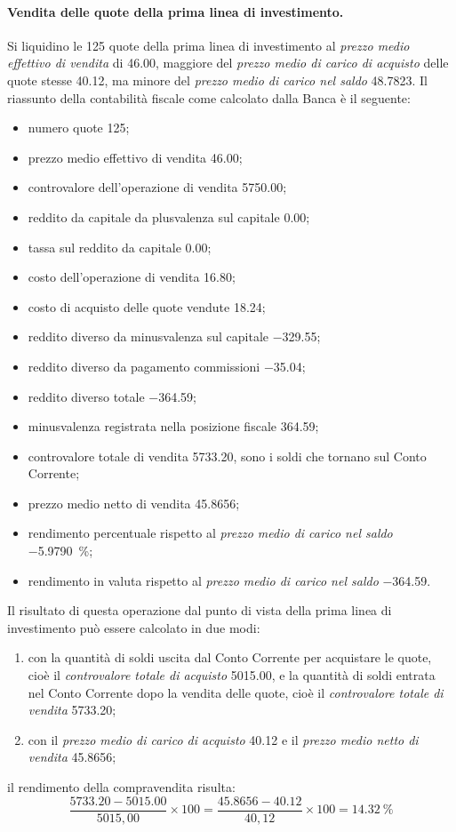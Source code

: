 \documentclass[12pt,a4paper]{article}
\newcommand{\Eur}[1]{\SI{#1}{\text{\euro{}}}}
\newcommand{\CalcoloRendimentoPercentuale}[2]{\frac{\num{#1} - \num{#2}}{#2} \times{} \num{100}}
\newcommand{\PrezzoMedioEffettivoVendita}{\emph{prezzo medio effettivo di vendita}}
\newcommand{\PrezzoMedioCaricoAcquisto}{\emph{prezzo medio di carico di acquisto}}
\newcommand{\PrezzoMedioCaricoSaldo}{\emph{prezzo medio di carico nel saldo}}
\begin{document}
\paragraph{Vendita delle quote della prima linea di investimento.}
Si liquidino le \num{125} quote della  prima linea di investimento al \PrezzoMedioEffettivoVendita{}
di \Eur{46,00}, maggiore del \PrezzoMedioCaricoAcquisto{}  delle quote stesse \Eur{40,12}, ma minore
del \PrezzoMedioCaricoSaldo{} \Eur{48,7823}.  Il riassunto  della contabilità fiscale come calcolato
dalla Banca è il seguente:
\begin{itemize}
\item numero quote \num{125};
\item prezzo medio effettivo di vendita \Eur{46,00};
\item controvalore dell'operazione di vendita \Eur{5750,00};
\item reddito da capitale da plusvalenza sul capitale \Eur{0,00};
\item tassa sul reddito da capitale \Eur{0,00};
\item costo dell'operazione di vendita \Eur{16,80};
\item costo di acquisto delle quote vendute \Eur{18,24};
\item reddito diverso da minusvalenza sul capitale \Eur{-329,55};
\item reddito diverso da pagamento commissioni \Eur{-35,04};
\item reddito diverso totale \Eur{-364,59};
\item minusvalenza registrata nella posizione fiscale \Eur{364,59};
\item controvalore totale di vendita \Eur{5733,20}, sono i soldi che tornano sul Conto Corrente;
\item prezzo medio netto di vendita \Eur{45,8656};
\item rendimento percentuale rispetto al \PrezzoMedioCaricoSaldo{} \SI{-5,9790}{\percent};
\item rendimento in valuta rispetto al \PrezzoMedioCaricoSaldo{} \Eur{-364,59}.
\end{itemize}
Il risultato di  questa operazione dal punto di  vista della prima linea di  investimento può essere
calcolato in due modi:
\begin{enumerate}
\item  con la  quantità  di  soldi uscita  dal  Conto  Corrente per  acquistare  le  quote, cioè  il
  \emph{controvalore totale  di acquisto} \Eur{5015,00},  e la quantità  di soldi entrata  nel Conto
  Corrente dopo la vendita delle quote, cioè il \emph{controvalore totale di vendita} \Eur{5733,20};
\item con il \emph{prezzo medio di carico di  acquisto} \Eur{40,12} e il \emph{prezzo medio netto di
     vendita} \Eur{45,8656};
\end{enumerate}
il rendimento della compravendita risulta:
\begin{equation*}
  \CalcoloRendimentoPercentuale{5733,20}{5015,00} =
  \CalcoloRendimentoPercentuale{45,8656}{40,12} = \SI{14,32}{\percent}
\end{equation*}
\end{document}
